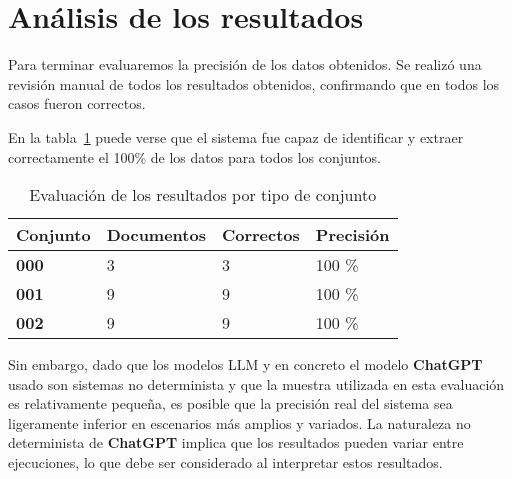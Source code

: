 \section{Análisis de los resultados}

Para terminar evaluaremos la precisión de los datos obtenidos.
Se realizó una revisión manual de todos los resultados obtenidos, confirmando que en todos los casos fueron
correctos.

En la tabla~\ref{tab:data_set_performance} puede verse que el sistema fue capaz de identificar y extraer
correctamente el 100\% de los datos para todos los conjuntos.

\begin{table}[h]
    \renewcommand{\arraystretch}{1.5}
    \setlength{\tabcolsep}{10pt}
    \begin{tabular}{>{\bfseries}p{} p{} p{} p{}}
        \toprule
        \textbf{Conjunto} & \textbf{Documentos} & \textbf{Correctos} & \textbf{Precisión} \\
        \midrule
        \textbf{000}      & 3                   & 3                  & 100 \%             \\
        \textbf{001}      & 9                   & 9                  & 100 \%             \\
        \textbf{002}      & 9                   & 9                  & 100 \%             \\
        \bottomrule
    \end{tabular}
    \caption{Evaluación de los resultados por tipo de conjunto}
    \label{tab:data_set_performance}
\end{table}

Sin embargo, dado que los modelos LLM y en concreto el modelo \textbf{ChatGPT} usado son sistemas no determinista y
que la muestra utilizada en esta evaluación es relativamente pequeña, es posible que la precisión real del sistema sea
ligeramente inferior en escenarios más amplios y variados.
La naturaleza no determinista de \textbf{ChatGPT}
implica que los resultados pueden variar entre ejecuciones, lo que debe ser considerado al interpretar estos resultados.
